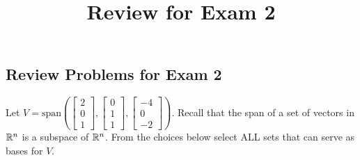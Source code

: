 \documentclass{ximera}
\title{Review for Exam 2} \license{CC BY-NC-SA 4.0}
\begin{document}
\begin{abstract}
 \end{abstract}
\maketitle

\begin{onlineOnly}
\section*{Review Problems for Exam 2}
\end{onlineOnly}

\begin{exercise}
Let $V=\text{span}\left(\begin{bmatrix}2\\0\\1\end{bmatrix},\begin{bmatrix}0\\1\\1\end{bmatrix}, \begin{bmatrix}-4\\0\\-2\end{bmatrix}\right)$.
Recall that the span of a set of vectors in $\mathbb{R}^n$ is a subspace of $\mathbb{R}^n$.  From the choices below select ALL sets that can serve as bases for $V$.
 

\end{exercise}
\end{document}
